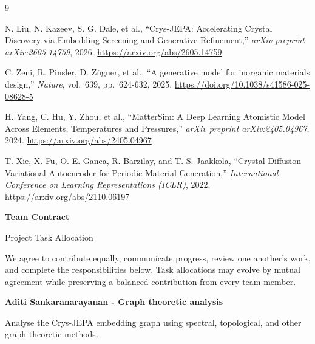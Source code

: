 \documentclass[10pt,a4paper]{article}
\begin{document}
\clearpage
\fontsize{9.5}{11.5}\selectfont
\begin{thebibliography}{9}
\setlength{\itemsep}{5pt}

N. Liu, N. Kazeev, S. G. Dale, et al.,
``Crys-JEPA: Accelerating Crystal Discovery via Embedding Screening and Generative Refinement,''
\emph{arXiv preprint arXiv:2605.14759}, 2026.
\url{https://arxiv.org/abs/2605.14759}

C. Zeni, R. Pinsler, D. Z\"ugner, et al.,
``A generative model for inorganic materials design,''
\emph{Nature}, vol.~639, pp.~624-632, 2025.
\url{https://doi.org/10.1038/s41586-025-08628-5}

H. Yang, C. Hu, Y. Zhou, et al.,
``MatterSim: A Deep Learning Atomistic Model Across Elements, Temperatures and Pressures,''
\emph{arXiv preprint arXiv:2405.04967}, 2024.
\url{https://arxiv.org/abs/2405.04967}

T. Xie, X. Fu, O.-E. Ganea, R. Barzilay, and T. S. Jaakkola,
``Crystal Diffusion Variational Autoencoder for Periodic Material Generation,''
\emph{International Conference on Learning Representations (ICLR)}, 2022.
\url{https://arxiv.org/abs/2110.06197}

\end{thebibliography}

\clearpage
\fontsize{10.5}{13}\selectfont

\begin{center}
  {\color{navy}\bfseries\fontsize{18}{21}\selectfont Team Contract}\par
  \vspace{2pt}
  {\color{muted}\large Project Task Allocation}
\end{center}
\vspace{5mm}

We agree to contribute equally, communicate progress, review one another's work, and complete the
responsibilities below. Task allocations may evolve by mutual agreement while preserving a balanced
contribution from every team member.

\vspace{7mm}
\noindent{\color{navy!35}\rule{\textwidth}{0.5pt}}
\vspace{3mm}

\textbf{Aditi Sankaranarayanan - Graph theoretic analysis}\par
Analyse the Crys-JEPA embedding graph using spectral, topological, and other graph-theoretic methods.
\end{document}
